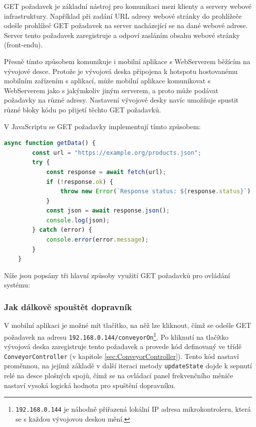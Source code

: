 GET požadavek je základní nástroj pro komunikaci mezi klienty a servery webové infrastruktury. Například při zadání URL adresy webové stránky do prohlížeče odešle prohlížeč GET požadavek na server nacházející se na dané webové adrese. Server tento požadavek zaregistruje a odpoví zasláním obsahu webové stránky (front-endu).

Přesně tímto způsobem komunikuje i mobilní aplikace s WebServerem běžícím na vývojové desce. Protože je vývojová deska připojena k hotspotu hostovanému mobilním zařízením s aplikací, může mobilní aplikace komunikovat s WebServerem jako s jakýmkoliv jiným serverem, a proto může podávat požadavky na různé adresy. Nastavení vývojové desky navíc umožňuje spustit různé bloky kódu po přijetí těchto GET požadavků.

V JavaScriptu se GET požadavky implementují tímto způsobem:
\cite{JavaScriptGET}

\begin{lstlisting}[language=JavaScript, caption={Základní způsob posílání GET požadavků v JavaScriptu }, label={lst:JavaScriptFetchFunkce}]
	async function getData() {
		const url = "https://example.org/products.json";
		try {
			const response = await fetch(url);
			if (!response.ok) {
				throw new Error(`Response status: ${response.status}`);
			}
			const json = await response.json();
			console.log(json);
		} catch (error) {
			console.error(error.message);
		}
	}
\end{lstlisting}

Níže jsou popsány tři hlavní způsoby využití GET požadavků pro ovládání systému:

\subsubsection{Jak dálkově spouštět dopravník}
V mobilní aplikaci je možné mít tlačítko, na něž lze kliknout, čímž se odešle GET požadavek na adresu \texttt{192.168.0.144/conveyorOn}\footnote{\texttt{192.168.0.144} je náhodně přiřazená lokální IP adresa mikrokontroleru, která se s každou vývojovou deskou mění.}. Po kliknutí na tlačítko vývojová deska zaregistruje tento požadavek a provede kód definovaný ve třídě \texttt{ConveyorController} (v kapitole \ref{sec:ConveyorController}). Tento kód nastaví proměnnou, na jejímž základě v další iteraci metody \texttt{updateState} dojde k sepnutí relé na desce plošných spojů, čímž se na ovládací panel frekvenčního měniče nastaví vysoká logická hodnota pro spuštění dopravníku.

